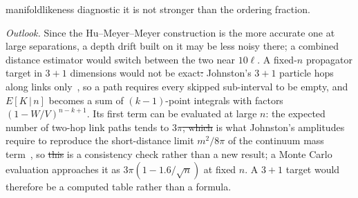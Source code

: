\documentclass[12pt]{iopart} %
\makeatletter
\providecommand{\DIFaddtex}[1]{{\protect\color{blue}\uwave{#1}}} %
\providecommand{\DIFdeltex}[1]{{\protect\color{red}\sout{#1}}} %
\providecommand{\DIFaddbegin}{} %
\providecommand{\DIFaddend}{} %
\providecommand{\DIFdelbegin}{} %
\providecommand{\DIFdelend}{} %
\providecommand{\DIFadd}[1]{\texorpdfstring{\DIFaddtex{#1}}{#1}} %
\providecommand{\DIFdel}[1]{\texorpdfstring{\DIFdeltex{#1}}{}} %
\providecommand{\DIFscaledelfig}{0.5}
\newlength{\DIFdelgraphicswidth} %
\newlength{\DIFdelgraphicsheight} %
\providecommand{\DIFaddincludegraphics}[2][]{{\color{blue}\fbox{\DIFOincludegraphics[#1]{#2}}}} %
\providecommand{\DIFdelincludegraphics}[2][]{%
\sbox{\DIFdelgraphicsbox}{\DIFOincludegraphics[#1]{#2}}%
\settoboxwidth{\DIFdelgraphicswidth}{\DIFdelgraphicsbox} %
\settoboxtotalheight{\DIFdelgraphicsheight}{\DIFdelgraphicsbox} %
\scalebox{\DIFscaledelfig}{%
\parbox[b]{\DIFdelgraphicswidth}{\usebox{\DIFdelgraphicsbox}\\[-\baselineskip] \rule{\DIFdelgraphicswidth}{0em}}\llap{\resizebox{\DIFdelgraphicswidth}{\DIFdelgraphicsheight}{%
\setlength{\unitlength}{\DIFdelgraphicswidth}%
\begin{picture}(1,1)%
\thicklines\linethickness{2pt} %
{\color[rgb]{1,0,0}\put(0,0){\framebox(1,1){}}}%
{\color[rgb]{1,0,0}\put(0,0){\line( 1,1){1}}}%
{\color[rgb]{1,0,0}\put(0,1){\line(1,-1){1}}}%
\end{picture}%
}\hspace*{3pt}}} %
} %
\DeclareRobustCommand{\DIFaddbegin}{\DIFOaddbegin \let\includegraphics\DIFaddincludegraphics} %
\DeclareRobustCommand{\DIFaddend}{\DIFOaddend \let\includegraphics\DIFOincludegraphics} %
\DeclareRobustCommand{\DIFdelbegin}{\DIFOdelbegin \let\includegraphics\DIFdelincludegraphics} %
\DeclareRobustCommand{\DIFdelend}{\DIFOaddend \let\includegraphics\DIFOincludegraphics} %
\let\sout@orig\sout %
\renewcommand{\sout}[1]{\ifmmode\text{\sout@orig{\ensuremath{#1}}}\else\sout@orig{#1}\fi} %
\makeatother
\begin{document}
manifoldlikeness diagnostic it is not stronger than the ordering fraction.

\emph{Outlook.} Since the Hu--Meyer--Meyer construction is the more accurate one at large separations, a depth drift built on it may be less noisy there; a combined distance estimator would switch between the two near $10\ell$. A fixed-$n$ propagator target in $3+1$ dimensions would not be exact\DIFdelbegin \DIFdel{: }\DIFdelend \DIFaddbegin \DIFadd{. }\DIFaddend Johnston's $3+1$ particle hops along links only~\cite{Johnston08}, so a path requires every skipped sub-interval to be empty, and $E[K\,|\,n]$ becomes a sum of $(k-1)$-point integrals with factors $(1-W/V)^{n-k+1}$. Its first term can be evaluated at large $n$: the expected number of two-hop link paths tends to $3\pi$\DIFdelbegin \DIFdel{, which }\DIFdelend \DIFaddbegin \DIFadd{. This }\DIFaddend is what Johnston's amplitudes require to reproduce the short-distance limit $m^2/8\pi$ of the continuum mass term~\cite{Johnston08}, so \DIFdelbegin \DIFdel{this }\DIFdelend \DIFaddbegin \DIFadd{it }\DIFaddend is a consistency check rather than a new result; a Monte Carlo evaluation approaches it as $3\pi(1-1.6/\sqrt n)$ at fixed $n$. A $3+1$ target would therefore be a computed table rather than a formula.
\end{document}
